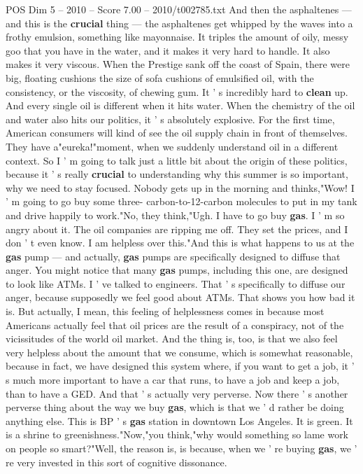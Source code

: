 \begin{textsample}{POS Dim 5 – 2010 – Score 7.00 – 2010/t002785.txt}
And then the asphaltenes — and this is the \textbf{crucial} thing — the asphaltenes get whipped by the waves into a frothy emulsion, something like mayonnaise.
It triples the amount of oily, messy goo that you have in the water, and it makes it very hard to handle.
It also makes it very viscous.
When the Prestige sank off the coast of Spain, there were big, floating cushions the size of sofa cushions of emulsified oil, with the consistency, or the viscosity, of chewing gum.
It ' s incredibly hard to \textbf{clean} up.
And every single oil is different when it hits water.
When the chemistry of the oil and water also hits our politics, it ' s absolutely explosive.
For the first time, American consumers will kind of see the oil supply chain in front of themselves.
They have a"eureka!"moment, when we suddenly understand oil in a different context.
So I ' m going to talk just a little bit about the origin of these politics, because it ' s really \textbf{crucial} to understanding why this summer is so important, why we need to stay focused.
Nobody gets up in the morning and thinks,"Wow!
I ' m going to go buy some three- carbon-to-12-carbon molecules to put in my tank and drive happily to work."No, they think,"Ugh.
I have to go buy \textbf{gas}.
I ' m so angry about it.
The oil companies are ripping me off.
They set the prices, and I don ' t even know.
I am helpless over this."And this is what happens to us at the \textbf{gas} pump — and actually, \textbf{gas} pumps are specifically designed to diffuse that anger.
You might notice that many \textbf{gas} pumps, including this one, are designed to look like ATMs.
I ' ve talked to engineers.
That ' s specifically to diffuse our anger, because supposedly we feel good about ATMs.
That shows you how bad it is.
But actually, I mean, this feeling of helplessness comes in because most Americans actually feel that oil prices are the result of a conspiracy, not of the vicissitudes of the world oil market.
And the thing is, too, is that we also feel very helpless about the amount that we consume, which is somewhat reasonable, because in fact, we have designed this system where, if you want to get a job, it ' s much more important to have a car that runs, to have a job and keep a job, than to have a GED.
And that ' s actually very perverse.
Now there ' s another perverse thing about the way we buy \textbf{gas}, which is that we ' d rather be doing anything else.
This is BP ' s \textbf{gas} station in downtown Los Angeles.
It is green.
It is a shrine to greenishness."Now,"you think,"why would something so lame work on people so smart?"Well, the reason is, is because, when we ' re buying \textbf{gas}, we ' re very invested in this sort of cognitive dissonance.

\end{textsample}
